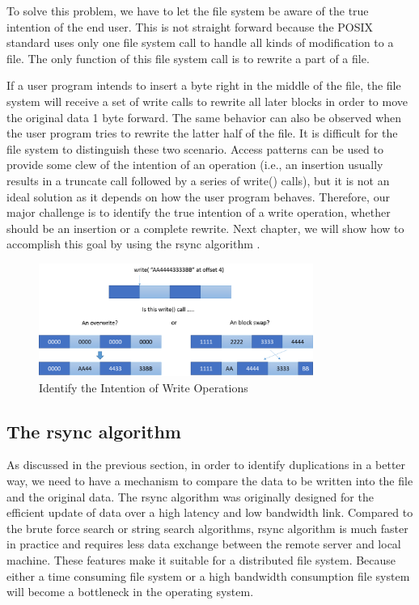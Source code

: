     To solve this problem, we have to let the file system be aware of the true intention of the end user. This is not straight forward because the POSIX standard uses only one file system call to handle all kinds of modification to a file. The only function of this file system call is to rewrite a part of a file.
    
    If a user program intends to insert a byte right in the middle of the file, the file system will receive a set of write calls to rewrite all later blocks in order to move the original data 1 byte forward. The same behavior can also be observed when the user program tries to rewrite the latter half of the file. It is difficult for the file system to distinguish these two scenario. Access patterns can be used to provide some clew of the intention of an operation (i.e., an insertion usually results in a truncate call followed by a series of write() calls), but it is not an ideal solution as it depends on how the user program behaves. Therefore, our major challenge is to identify the true intention of a write operation, whether should be an insertion or a complete rewrite. Next chapter, we will show how to accomplish this goal by using the rsync algorithm \cite{rsync_alg}.

\begin{figure}[t]
\centering
\includegraphics[width=0.8\textwidth]{Chapter-4/figs/fig6.png}
\caption{Identify the Intention of Write Operations}
\label{fig:write_intention}
\end{figure}

\subsection{The rsync algorithm}

    As discussed in the previous section, in order to identify duplications in a better way, we need to have a mechanism to compare the data to be written into the file and the original data. The rsync algorithm was originally designed for the efficient update of data over a high latency and low bandwidth link. Compared to the brute force search or string search algorithms, rsync algorithm is much faster in practice and requires less data exchange between the remote server and local machine. These features make it suitable for a distributed file system. Because either a time consuming file system or a high bandwidth consumption file system will become a bottleneck in the operating system.

